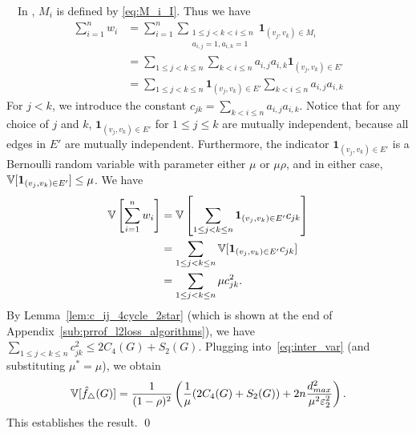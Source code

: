 {%
\smallskip
{}~~In \AlgOne{}, $M_i$ is defined by \eqref{eq:M_i_I}. Thus we have
\begin{align*}
  \sum_{i=1}^n w_i &= \sum_{i=1}^n \sum_{\substack{1 \leq j < k < i \leq n \\ a_{i,j} = 1, a_{i,k} = 1}} \textbf{1}_{(v_j, v_k) \in M_i} \\
  &= \sum_{1 \leq j < k \leq n} \sum_{k < i \leq n} a_{i,j} a_{i,k} \textbf{1}_{(v_j, v_k) \in E'} \\
  &= \sum_{1 \leq j < k \leq n} \textbf{1}_{(v_j, v_k) \in E'}\sum_{k < i \leq n} a_{i,j} a_{i,k}
\end{align*}
For $j < k$, we introduce the constant $c_{jk} = \sum_{k < i \leq n} a_{i,j} a_{i,k}$. Notice that
for any choice of $j$ and $k$, $\textbf{1}_{(v_j, v_k) \in E'}$ for $1 \leq j \leq k$ are mutually independent,
because all edges in $E'$ are mutually independent. Furthermore, the indicator
$\textbf{1}_{(v_j, v_k) \in E'}$ is a Bernoulli random variable with parameter
either $\mu$ or $\mu\rho$, and in either case, $\operatorname{\mathbb{V}}[\textbf{1}_{(v_j, v_k) \in
E'}] \leq \mu$. We have
\begin{align*}
  \operatorname{\mathbb{V}}\left[\sum_{i=1}^n w_i\right]
  &= \operatorname{\mathbb{V}}\left[\sum_{1 \leq j < k \leq n} \textbf{1}_{(v_j, v_k) \in E'}c_{jk}\right] \\
  &= \sum_{1 \leq j < k \leq n} \operatorname{\mathbb{V}}[\textbf{1}_{(v_j, v_k) \in E'}c_{jk}] \\
  &= \sum_{1 \leq j < k \leq n} \mu c_{jk}^2.
\end{align*}
By Lemma~\ref{lem:c_ij_4cycle_2star} (which is shown at the end of Appendix~\ref{sub:prrof_l2loss_algorithms}), we have $\sum_{1 \leq j < k \leq n} c_{jk}^2 \leq 2 C_4(G) + S_2(G)$.
Plugging into~\eqref{eq:inter_var} (and substituting $\mu^* = \mu$), we obtain
\begin{align*}
  \operatorname{\mathbb{V}}[\hat{f}_\triangle(G)]
  &= \frac{1}{(1-\rho)^2}\left(\frac{1}{\mu}(2C_4(G) + S_2(G)) +
  2n\frac{d_{max}^2}{\mu^2\varepsilon_2^2}\right). \\
\end{align*}
This establishes the result. \qed

}
